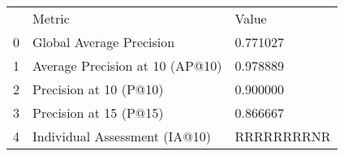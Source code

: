 \begin{tabular}{lll}
 & Metric & Value \\
0 & Global Average Precision & 0.771027 \\
1 & Average Precision at 10 (AP@10) & 0.978889 \\
2 & Precision at 10 (P@10) & 0.900000 \\
3 & Precision at 15 (P@15) & 0.866667 \\
4 & Individual Assessment (IA@10) & RRRRRRRRNR \\
\end{tabular}
